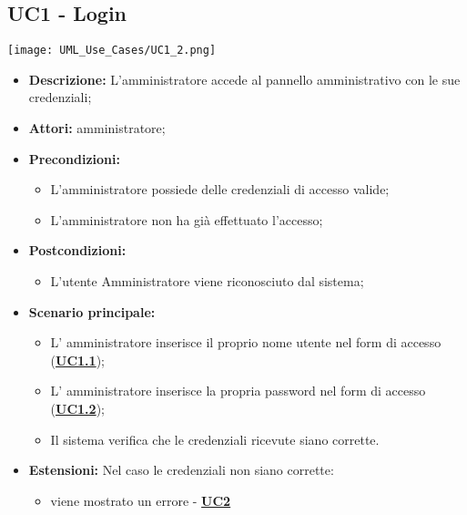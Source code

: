 \setcounter{secnumdepth}{0}

\subsection{UC1 - Login}
\label{sec:UC1}
\texttt{[image: UML\_Use\_Cases/UC1\_2.png]}
\begin{itemize}
	\item \textbf{Descrizione:} L’amministratore accede al pannello amministrativo con le sue credenziali;
	\item \textbf{Attori:} amministratore;
	\item \textbf{Precondizioni:} 
	\begin{itemize}
		\item L’amministratore possiede delle credenziali di accesso valide;
		\item L’amministratore non ha già effettuato l’accesso;
	\end{itemize}
	\item \textbf{Postcondizioni:} 
	\begin{itemize}
		\item L’utente Amministratore viene riconosciuto dal sistema;
	\end{itemize}
	\item \textbf{Scenario principale:} 
	\begin{itemize}
		\item L’ amministratore inserisce il proprio nome utente nel form di accesso (\hyperref[sec:UC1.1]{\textbf{UC1.1}});
		\item L’ amministratore inserisce la propria password nel form di accesso (\hyperref[sec:UC1.2]{\textbf{UC1.2}});
		\item Il sistema verifica che le credenziali ricevute siano corrette. 
	\end{itemize}
	\item \textbf{Estensioni:} Nel caso le credenziali non siano corrette:
	\begin{itemize}
		\item viene mostrato un errore - \hyperref[sec:UC2]{\textbf{UC2}}
	\end{itemize}
\end{itemize}

